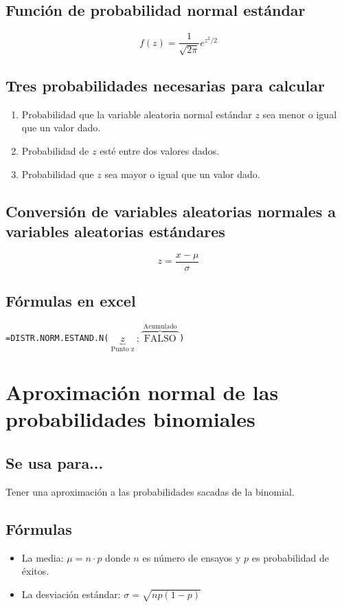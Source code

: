 \documentclass{article}
\begin{document}
\subsection{Función de probabilidad normal estándar}
\[
  f(z) = \frac{1}{\sqrt{2\pi}} e^{z^2/2}
\]

\subsection{Tres probabilidades necesarias para calcular}
\begin{enumerate}
    \item Probabilidad que la variable aleatoria normal estándar $z$ sea menor o igual que un valor dado. 
    \item Probabilidad de $z$ esté entre dos valores dados. 
    \item Probabilidad que $z$ sea mayor o igual que un valor dado. 
\end{enumerate}

\subsection{Conversión de variables aleatorias normales a variables aleatorias estándares}
\[
  z = \frac{x-\mu}{\sigma} 
\]

\subsection{Fórmulas en excel}
\begin{center}
   \verb|=DISTR.NORM.ESTAND.N(|$\underbrace{z}_{\text{ Punto z }};\overbrace{\text{ FALSO }}^{\text{ Acumulado }}$\verb|)|
\end{center}

\hrulefill
\section{Aproximación normal de las probabilidades binomiales}
\subsection{Se usa para...}
Tener una aproximación a las probabilidades sacadas de la binomial.

\subsection{Fórmulas}
\begin{itemize}
    \item La media: $\mu=n\cdot p$ donde $n$ es número de ensayos y $p$ es probabilidad de éxitos. 
    \item La desviación estándar: $\sigma=\sqrt{np(1-p)}$ 
\end{itemize}
\end{document}
